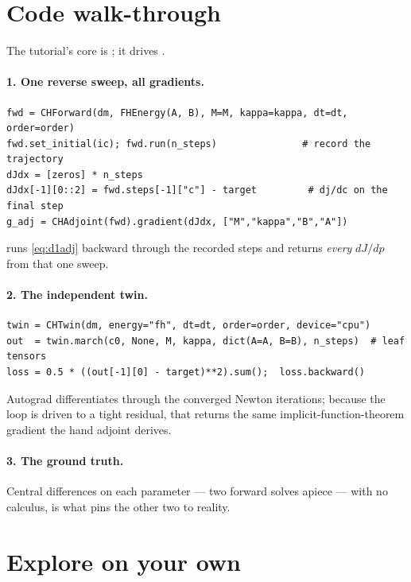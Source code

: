 \section{Code walk-through}

The tutorial's core is ; it drives
.

\paragraph{1. One reverse sweep, all gradients.}
\begin{lstlisting}
fwd = CHForward(dm, FHEnergy(A, B), M=M, kappa=kappa, dt=dt, order=order)
fwd.set_initial(ic); fwd.run(n_steps)               # record the trajectory
dJdx = [zeros] * n_steps
dJdx[-1][0::2] = fwd.steps[-1]["c"] - target         # dj/dc on the final step
g_adj = CHAdjoint(fwd).gradient(dJdx, ["M","kappa","B","A"])
\end{lstlisting}
 runs \eqref{eq:d1adj} backward through the recorded
steps and returns \emph{every} $dJ/dp$ from that one sweep.

\paragraph{2. The independent twin.}
\begin{lstlisting}
twin = CHTwin(dm, energy="fh", dt=dt, order=order, device="cpu")
out  = twin.march(c0, None, M, kappa, dict(A=A, B=B), n_steps)  # leaf tensors
loss = 0.5 * ((out[-1][0] - target)**2).sum();  loss.backward()
\end{lstlisting}
Autograd differentiates through the converged Newton iterations; because
the loop is driven to a tight residual, that returns the same
implicit-function-theorem gradient the hand adjoint derives.

\paragraph{3. The ground truth.}
Central differences on each parameter --- two forward solves apiece --- with
no calculus, is what pins the other two to reality.

\section{Explore on your own}


